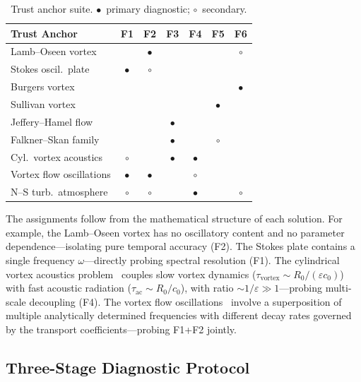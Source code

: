 \documentclass[conference]{IEEEtran}
\begin{document}
\begin{table}[t]
\centering
\caption{Trust anchor suite. $\bullet$~primary diagnostic; $\circ$~secondary.}
\label{tab:anchors}
\small
\begin{tabular}{@{}lcccccc@{}}
\toprule
\textbf{Trust Anchor} & \textbf{F1} & \textbf{F2} & \textbf{F3} & \textbf{F4} & \textbf{F5} & \textbf{F6} \\
\midrule
Lamb--Oseen vortex         &      & $\bullet$ &      &      &      & $\circ$ \\
Stokes oscil.\ plate       & $\bullet$ & $\circ$ &      &      &      &      \\
Burgers vortex              &      &      &      &      &      & $\bullet$ \\
Sullivan vortex             &      &      &      &      & $\bullet$ &      \\
Jeffery--Hamel flow         &      &      & $\bullet$ &      &      &      \\
Falkner--Skan family        &      &      & $\bullet$ &      & $\circ$ &      \\
Cyl.\ vortex acoustics     & $\circ$ &      & $\bullet$ & $\bullet$ &      &      \\
Vortex flow oscillations    & $\bullet$ & $\bullet$ &      & $\circ$ &      &      \\
N--S turb.\ atmosphere      & $\circ$ & $\circ$ &      & $\bullet$ &      & $\circ$ \\
\bottomrule
\end{tabular}
\end{table}

The assignments follow from the mathematical structure of each solution. For example, the Lamb--Oseen vortex has no oscillatory content and no parameter dependence---isolating pure temporal accuracy (F2). The Stokes plate contains a single frequency $\omega$---directly probing spectral resolution (F1). The cylindrical vortex acoustics problem~\cite{PetrovaShugaev2015} couples slow vortex dynamics ($\tau_{\mathrm{vortex}} \sim R_0/(\varepsilon c_0)$) with fast acoustic radiation ($\tau_{\mathrm{ac}} \sim R_0/c_0$), with ratio $\sim 1/\varepsilon \gg 1$---probing multi-scale decoupling (F4). The vortex flow oscillations~\cite{PetrovaShugaev2012} involve a superposition of multiple analytically determined frequencies with different decay rates governed by the transport coefficients---probing F1+F2 jointly.

\subsection{Three-Stage Diagnostic Protocol}
\label{sec:diag}
\end{document}

